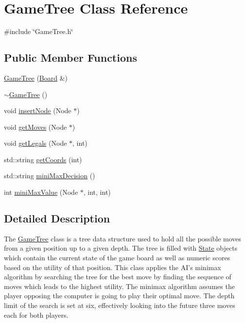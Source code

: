 \hypertarget{class_game_tree}{\section{Game\-Tree Class Reference}
\label{class_game_tree}
}


{\ttfamily \#include \char`\"{}Game\-Tree.\-h\char`\"{}}

\subsection*{Public Member Functions}
\begin{DoxyCompactItemize}
\item 
\hyperlink{class_game_tree_a88f39447182520281da9f1ee419ebc27}{Game\-Tree} (\hyperlink{class_board}{Board} \&)
\item 
\hyperlink{class_game_tree_affdde7b9a8c14746c78178aeb8f87102}{$\sim$\-Game\-Tree} ()
\item 
void \hyperlink{class_game_tree_a20ac6eb474e44847646d3231d7ef2fc0}{insert\-Node} (Node $\ast$)
\item 
void \hyperlink{class_game_tree_a9c0b8d81a67c61a2f02e9c8940305995}{get\-Moves} (Node $\ast$)
\item 
void \hyperlink{class_game_tree_aaf2185a3a026a9ed2dc548c8e4414487}{get\-Legals} (Node $\ast$, int)
\item 
std\-::string \hyperlink{class_game_tree_af44e69f9e30a9149a7050d0bd256bb8f}{get\-Coords} (int)
\item 
std\-::string \hyperlink{class_game_tree_a0964729fc04a2cc51c52992fd8d462d9}{mini\-Max\-Decision} ()
\item 
int \hyperlink{class_game_tree_a4ed9d328a670bb24ce04fff4eaf3f99d}{mini\-Max\-Value} (Node $\ast$, int, int)
\end{DoxyCompactItemize}


\subsection{Detailed Description}
The \hyperlink{class_game_tree}{Game\-Tree} class is a tree data structure used to hold all the possible moves from a given position up to a given depth. The tree is filled with \hyperlink{class_state}{State} objects which contain the current state of the game board as well as numeric scores based on the utility of that position. This class applies the A\-I's minimax algorithm by searching the tree for the best move by finding the sequence of moves which leads to the highest utility. The minimax algorithm assumes the player opposing the computer is going to play their optimal move. The depth limit of the search is set at six, effectively looking into the future three moves each for both players. 


